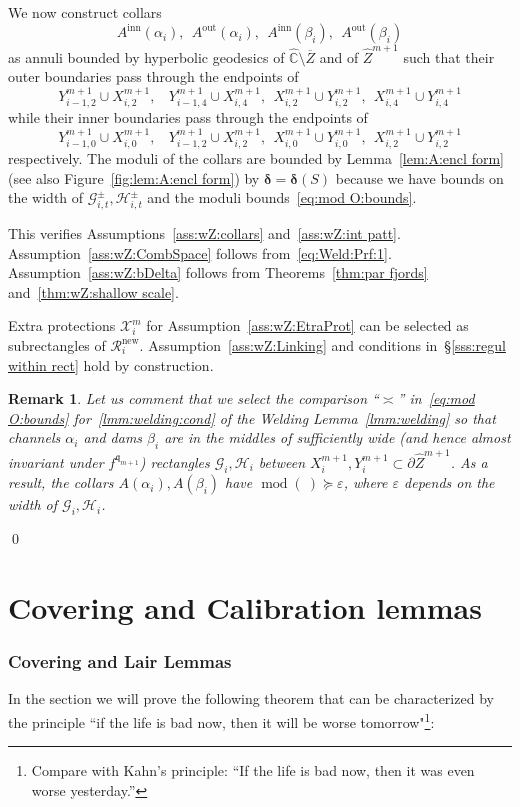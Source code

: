 \documentclass{amsart}
\renewcommand{\sp}{{\ \ }}
\newcommand{\1}{{\mathbb 1 }}
\newcommand{\FamG}{{\mathcal G}}
\newcommand{\FamH}{{\mathcal H}}
\newcommand\RR{\mathcal{R}}
\newcommand\XX{\mathcal{X}}
\newcommand{\wZ}{{\widehat Z}}
\newcommand{\qq}{\mathfrak{q}}
\newcommand\inn{{\operatorname{inn}}}
\newcommand\out{{\operatorname{out}}}
\newcommand\new{{\operatorname{new}}}
\newcommand{\wC}{\widehat{\mathbb{C}}}
\newtheorem{rem}[thm]{Remark}
\theoremstyle{remark}
\numberwithin{equation}{section}
\theoremstyle{definition}
\renewcommand{\mod}{\operatorname{mod}}
\newcommand{\bdelta}{{\boldsymbol{ \delta}}}
\begin{document}
We now construct collars \[A^\inn(\alpha_i),\sp A^\out(\alpha_i),\sp  A^\inn(\beta_i), \sp A^\out(\beta_i)\]
 as annuli bounded by hyperbolic geodesics of $\wC\setminus \overline Z$ and of $\wZ^{m+1}$  such that their outer boundaries pass through the endpoints of \[Y^{m+1}_{i-1,2}\cup X^{m+1}_{i,2},\sp\sp Y^{m+1}_{i-1,4}\cup X^{m+1}_{i,4},\sp X^{m+1}_{i,2}\cup Y^{m+1}_{i,2},\sp X^{m+1}_{i,4}\cup Y^{m+1}_{i,4}\] while their inner boundaries pass through the endpoints of \[Y^{m+1}_{i-1,0}\cup X^{m+1}_{i,0},\sp\sp Y^{m+1}_{i-1,2}\cup X^{m+1}_{i,2},\sp X^{m+1}_{i,0}\cup Y^{m+1}_{i,0},\sp X^{m+1}_{i,2}\cup Y^{m+1}_{i,2}\] 
 respectively. The moduli of the collars are bounded by Lemma~\ref{lem:A:encl form} (see also Figure~\ref{fig:lem:A:encl form}) by $\bdelta=\bdelta(S)$ because we have bounds on the width of $\FamG^\pm_{i,t}, \FamH^\pm _{i,t}$ and the moduli bounds~\eqref{eq:mod O:bounds}.


This verifies Assumptions~\ref{ass:wZ:collars} and~\ref{ass:wZ:int patt}. Assumption~\ref{ass:wZ:CombSpace} follows from~\eqref{eq:Weld:Prf:1}. Assumption~\ref{ass:wZ:bDelta} follows from Theorems~\ref{thm:par fjords} and~\ref{thm:wZ:shallow scale}. 

Extra protections $\XX^m_i$ for Assumption~\ref{ass:wZ:EtraProt} can be selected as subrectangles of $\RR_i^\new$. Assumption~\ref{ass:wZ:Linking} and conditions in~\S\ref{sss:regul within rect}  hold by construction.

\begin{rem}
\label{rem:selections of:lmm:welding:cond} Let us comment that we select the comparison ``$\asymp$''  in~\eqref{eq:mod O:bounds} for~\eqref{lmm:welding:cond} of the Welding Lemma~\ref{lmm:welding} so that channels $\alpha_i$ and dams $\beta_i$ are in the middles of sufficiently wide (and hence almost invariant under $f^{\qq_{m+1}}$) rectangles $\FamG_i, \FamH_i$ between $X_i^{m+1},Y^{m+1}_i\subset \partial \wZ^{m+1}$. As a result, the collars $A(\alpha_i), A(\beta_i)$ have $\mod(\ ) \succeq \varepsilon$, where $\varepsilon$ depends on the width of $\FamG_i, \FamH_i$.
\end{rem}

\qed


\part{Covering and Calibration lemmas}
\label{part:CovCalibr}


\section{Covering and Lair Lemmas}\label{s:Covring+Lair Lmms}
In the section we will prove the following theorem that can be characterized by the principle ``if the life is bad now, then it will be worse tomorrow"\footnote{Compare with Kahn's principle: ``If the life is bad now, then it was even worse yesterday.''}:
\end{document}
